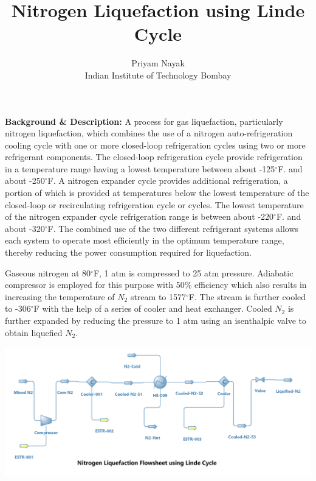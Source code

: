 \documentclass[a4paper,12pt]{article}
\title{Nitrogen Liquefaction using Linde Cycle} %
\author{Priyam Nayak \\ Indian Institute of Technology Bombay} %
\date{}
\begin{document}
\maketitle

\noindent \textbf{Background \& Description:} \newline A process for gas liquefaction, particularly nitrogen liquefaction, which combines the use of a nitrogen auto-refrigeration cooling cycle with one or more closed-loop refrigeration cycles using two or more refrigerant components. The closed-loop refrigeration cycle provide refrigeration in a temperature range having a lowest temperature between about -125$^\circ$F. and about -250$^\circ$F. A nitrogen expander cycle provides additional refrigeration, a portion of which is provided at temperatures below the lowest temperature of the closed-loop or recirculating refrigeration cycle or cycles. The lowest temperature of the nitrogen expander cycle refrigeration range is between about -220$^\circ$F. and about -320$^\circ$F. The combined use of the two different refrigerant systems allows each system to operate most efficiently in the optimum temperature range, thereby reducing the power consumption required for liquefaction.

Gaseous nitrogen at 80$^\circ$F, 1 atm is compressed to 25 atm pressure. Adiabatic compressor is employed for this purpose with 50\% efficiency which also results in increasing the temperature of $N_2$ stream to 1577$^\circ$F. The stream is further cooled to -306$^\circ$F with the help of a series of cooler and heat exchanger. Cooled $N_2$ is further expanded by reducing the pressure to 1 atm using an isenthalpic valve to obtain liquefied $N_2$.

\vspace{15mm}
\centerline{\includegraphics[width=1.2\linewidth]{N2-Liq.png}}
\end{document}
